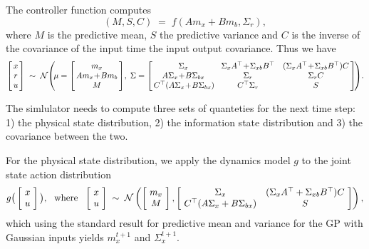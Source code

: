 \documentclass{article}
\begin{document}
The controller function computes
\begin{equation}
(M, S,C)\;=\;f(Am_x+Bm_b,\Sigma_r),
\end{equation}
where $M$ is the predictive mean, $S$ the predictive variance and $C$
is the inverse of the covariance of the input time the input output
covariance. Thus we have
\begin{equation}
\left[\!\!\begin{array}{c}x\\ r\\ u\end{array}\!\!\right]\;\sim\;{\cal
  N}\!\left(\!\mu=\left[\!\!\begin{array}{c}m_x\\  Am_x\!+\!Bm_b\\
      M\end{array}\!\!\right]\!,\;
\Sigma=\left[\!\!\begin{array}{ccc}\Sigma_x&\Sigma_xA^\top\!+\!\Sigma_{xb}B^\top&(\Sigma_xA^\top\!+\!\Sigma_{xb}B^\top)C\\
A\Sigma_x\!+\!B\Sigma_{bx}&\Sigma_r&\Sigma_rC\\
C^\top(A\Sigma_x\!+\!B\Sigma_{bx})\!&C^\top\Sigma_r&S\end{array}\!\!\right]\!\right)\!.
\label{eq:post}
\end{equation}
  
The simlulator needs to compute three sets of quanteties for the next
time step: 1) the physical state distribution, 2) the information state
distribution and 3) the covariance between the two.

For the physical state distribution, we apply the dynamics model $g$
to the joint state action distribution
\begin{equation}
g\big(\left[\!\begin{array}{c}x\\ u\end{array}\!\right]\big),\text{\ \ where\ \ }
\left[\!\begin{array}{c}x\\ u\end{array}\!\right]\;\sim\;{\cal
  N}\left(\left[\!\begin{array}{c}m_x\\ M\end{array}\!\right],
\left[\!\begin{array}{cc}\Sigma_x&(\Sigma_xA^\top+\Sigma_{xb}B^\top)C\\
C^\top(A\Sigma_x+B\Sigma_{bx})&S\end{array}\!\right]\right),
\end{equation}
which using the standard result for predictive mean and variance for
the GP with Gaussian inputs yields $m_x^{t+1}$ and $\Sigma_x^{t+1}$.
\end{document}

